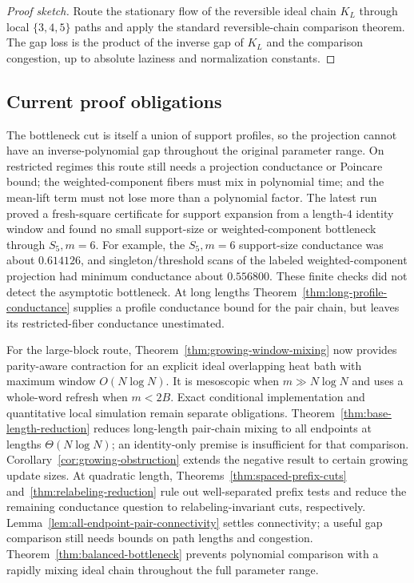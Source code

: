 \begin{proof}[Proof sketch]
Route the stationary flow of the reversible ideal chain $K_L$ through local
$\{3,4,5\}$ paths and apply the standard reversible-chain comparison theorem.
The gap loss is the product of the inverse gap of $K_L$ and the comparison
congestion, up to absolute laziness and normalization constants.
\end{proof}

\subsection{Current proof obligations}

The bottleneck cut is itself a union of support profiles, so the projection
cannot have an inverse-polynomial gap throughout the original parameter
range. On restricted regimes this route still needs
a projection conductance or Poincare bound;
the weighted-component fibers must mix in polynomial time; and the mean-lift
term must not lose more than a polynomial factor.  The latest run proved a
fresh-square certificate for support expansion from a length-$4$ identity
window and found no small support-size or weighted-component bottleneck through
$S_5,m=6$.  For example, the $S_5,m=6$ support-size conductance was about
$0.614126$, and singleton/threshold scans of the labeled weighted-component
projection had minimum conductance about $0.556800$.  These finite checks did not detect the asymptotic bottleneck. At long
lengths Theorem~\ref{thm:long-profile-conductance} supplies a profile
conductance bound for the pair chain, but leaves its restricted-fiber
conductance unestimated.

For the large-block route, Theorem~\ref{thm:growing-window-mixing} now
provides parity-aware contraction for an explicit ideal overlapping
heat bath with maximum window $O(N\log N)$.  It is mesoscopic when
$m\gg N\log N$ and uses a whole-word refresh when $m<2B$.
Exact conditional implementation and quantitative local simulation remain
separate obligations.  Theorem~\ref{thm:base-length-reduction} reduces
long-length pair-chain mixing to all endpoints at lengths
$\Theta(N\log N)$; an identity-only premise is insufficient for that
comparison.  Corollary~\ref{cor:growing-obstruction} extends the negative
result to certain growing update sizes.  At quadratic length,
Theorems~\ref{thm:spaced-prefix-cuts} and~\ref{thm:relabeling-reduction}
rule out well-separated prefix tests and reduce the remaining conductance
question to relabeling-invariant cuts, respectively.
Lemma~\ref{lem:all-endpoint-pair-connectivity} settles connectivity;
a useful gap comparison still needs bounds on path lengths and congestion.
Theorem~\ref{thm:balanced-bottleneck} prevents polynomial comparison
with a rapidly mixing ideal chain throughout the full parameter range.

